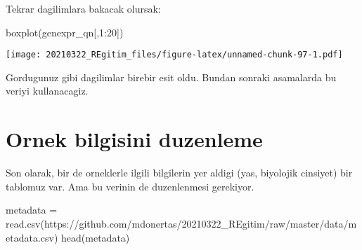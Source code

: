 \documentclass[
]{book}
\newenvironment{Shaded}{\begin{snugshade}}{\end{snugshade}}
\newcommand{\DecValTok}[1]{\textcolor[rgb]{0.00,0.00,0.81}{#1}}
\newcommand{\FunctionTok}[1]{\textcolor[rgb]{0.00,0.00,0.00}{#1}}
\newcommand{\NormalTok}[1]{#1}
\newcommand{\OtherTok}[1]{\textcolor[rgb]{0.56,0.35,0.01}{#1}}
\newcommand{\SpecialCharTok}[1]{\textcolor[rgb]{0.00,0.00,0.00}{#1}}
\newcommand{\StringTok}[1]{\textcolor[rgb]{0.31,0.60,0.02}{#1}}
\begin{document}
Tekrar dagilimlara bakacak olursak:

\begin{Shaded}
\begin{Highlighting}[]
\FunctionTok{boxplot}\NormalTok{(genexpr\_qn[,}\DecValTok{1}\SpecialCharTok{:}\DecValTok{20}\NormalTok{])}
\end{Highlighting}
\end{Shaded}

\texttt{[image: 20210322\_REgitim\_files/figure-latex/unnamed-chunk-97-1.pdf]}

Gordugunuz gibi dagilimlar birebir esit oldu. Bundan sonraki asamalarda bu veriyi kullanacagiz.

\hypertarget{ornek-bilgisini-duzenleme}{%
\section{Ornek bilgisini duzenleme}\label{ornek-bilgisini-duzenleme}}

Son olarak, bir de orneklerle ilgili bilgilerin yer aldigi (yas, biyolojik cinsiyet) bir tablomuz var. Ama bu verinin de duzenlenmesi gerekiyor.

\begin{Shaded}
\begin{Highlighting}[]
\NormalTok{metadata }\OtherTok{=} \FunctionTok{read.csv}\NormalTok{(}\StringTok{\textquotesingle{}https://github.com/mdonertas/20210322\_REgitim/raw/master/data/metadata.csv\textquotesingle{}}\NormalTok{)}
\FunctionTok{head}\NormalTok{(metadata)}
\end{Highlighting}
\end{Shaded}
\end{document}
